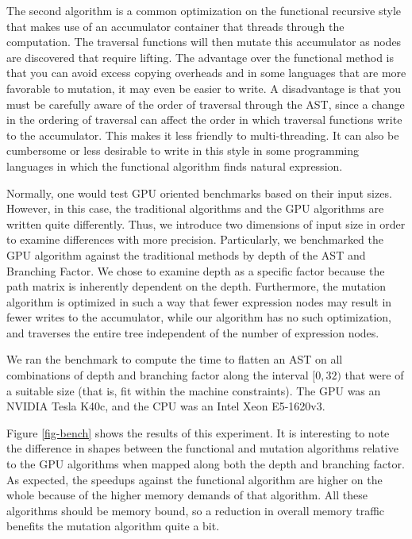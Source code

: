 ﻿\documentclass[numbers,10pt,preprint]{sigplanconf}
\begin{document}
The second algorithm is a common optimization on the functional recursive style that makes use of an accumulator container that threads through the computation. The traversal functions will then mutate this accumulator as nodes are discovered that require lifting. The advantage over the functional method is that you can avoid excess copying overheads and in some languages that are more favorable to mutation, it may even be easier to write. A disadvantage is that you must be carefully aware of the order of traversal through the AST, since a change in the ordering of traversal can affect the order in which traversal functions write to the accumulator. This makes it less friendly to multi-threading. It can also be cumbersome or less desirable to write in this style in some programming languages in which the functional algorithm finds natural expression.

Normally, one would test GPU oriented benchmarks based on their input sizes. However, in this case, the traditional algorithms and the GPU algorithms are written quite differently. Thus, we introduce two dimensions of input size in order to examine differences with more precision. Particularly, we benchmarked the GPU algorithm against the traditional methods by depth of the AST and Branching Factor. We chose to examine depth as a specific factor because the path matrix is inherently dependent on the depth. Furthermore, the mutation algorithm is optimized in such a way that fewer expression nodes may result in fewer writes to the accumulator, while our algorithm has no such optimization, and traverses the entire tree independent of the number of expression nodes. 

We ran the benchmark to compute the time to flatten an AST on all combinations of depth and branching factor along the interval $[0,32)$ that were of a suitable size (that is, fit within the machine constraints). The GPU was an NVIDIA Tesla K40c, and the CPU was an Intel Xeon  E5-1620v3. 

Figure \ref{fig-bench} shows the results of this experiment. It is interesting to note the difference in shapes between the functional and mutation algorithms relative to the GPU algorithms when mapped along both the depth and branching factor. As expected, the speedups against the functional algorithm are higher on the whole because of the higher memory demands of that algorithm. All these algorithms should be memory bound, so a reduction in overall memory traffic benefits the mutation algorithm quite a bit. 
\end{document}
